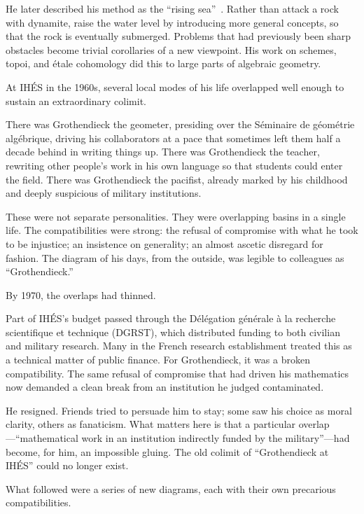 \documentclass[12pt,a4paper]{article}
\begin{document}
He later described his method as the ``rising sea''~\cite{mclarty}. Rather than attack a rock with dynamite, raise the water level by introducing more general concepts, so that the rock is eventually submerged. Problems that had previously been sharp obstacles become trivial corollaries of a new viewpoint. His work on schemes, topoi, and \'etale cohomology did this to large parts of algebraic geometry.

At IH\'ES in the 1960s, several local modes of his life overlapped well enough to sustain an extraordinary colimit.

There was Grothendieck the geometer, presiding over the S\'eminaire de g\'eom\'etrie alg\'ebrique, driving his collaborators at a pace that sometimes left them half a decade behind in writing things up. There was Grothendieck the teacher, rewriting other people's work in his own language so that students could enter the field. There was Grothendieck the pacifist, already marked by his childhood and deeply suspicious of military institutions.

These were not separate personalities. They were overlapping basins in a single life. The compatibilities were strong: the refusal of compromise with what he took to be injustice; an insistence on generality; an almost ascetic disregard for fashion. The diagram of his days, from the outside, was legible to colleagues as ``Grothendieck.''

By 1970, the overlaps had thinned.

Part of IH\'ES's budget passed through the D\'el\'egation g\'en\'erale \`a la recherche scientifique et technique (DGRST), which distributed funding to both civilian and military research. Many in the French research establishment treated this as a technical matter of public finance. For Grothendieck, it was a broken compatibility. The same refusal of compromise that had driven his mathematics now demanded a clean break from an institution he judged contaminated.

He resigned. Friends tried to persuade him to stay; some saw his choice as moral clarity, others as fanaticism. What matters here is that a particular overlap---``mathematical work in an institution indirectly funded by the military''---had become, for him, an impossible gluing. The old colimit of ``Grothendieck at IH\'ES'' could no longer exist.

What followed were a series of new diagrams, each with their own precarious compatibilities.
\end{document}
